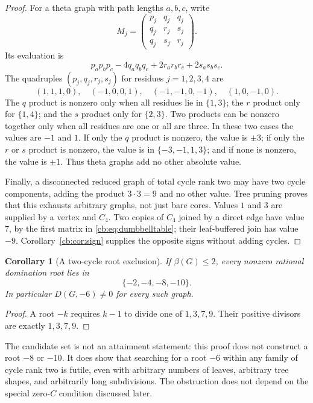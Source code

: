 \documentclass[11pt]{article}
\numberwithin{equation}{section}
\newtheorem{corollary}[theorem]{Corollary}
\theoremstyle{definition}
\begin{document}
\begin{proof}
For a theta graph with path lengths $a,b,c$, write
\[
 M_j=\begin{pmatrix}p_j&q_j&q_j\\q_j&r_j&s_j\\q_j&s_j&r_j\end{pmatrix}.
\]
Its evaluation is
\begin{equation}\label{cb:eq:theta}
 p_ap_bp_c-4q_aq_bq_c+2r_ar_br_c+2s_as_bs_c.
\end{equation}
The quadruples $(p_j,q_j,r_j,s_j)$ for residues $j=1,2,3,4$ are
\[
 (1,1,1,0),\quad(-1,0,0,1),\quad(-1,-1,0,-1),\quad(1,0,-1,0).
\]
The $q$ product is nonzero only when all residues lie in $\{1,3\}$;
the $r$ product only for $\{1,4\}$; and the $s$ product only for
$\{2,3\}$. Two products can be nonzero together only when all residues
are one or all are three. In these two cases the values are $-1$ and $1$.
If only the $q$ product is nonzero, the value is $\pm3$; if only the $r$
or $s$ product is nonzero, the value is in $\{-3,-1,1,3\}$; and if none
is nonzero, the value is $\pm1$. Thus theta graphs add no other absolute
value.

Finally, a disconnected reduced graph of total cycle rank two may have
two cycle components, adding the product $3\cdot3=9$ and no other value.
Tree pruning proves that this exhausts arbitrary graphs, not just bare
cores. Values $1$ and $3$ are supplied by a vertex and $C_4$. Two copies
of $C_4$ joined by a direct edge have value $7$, by the first matrix in
\eqref{cb:eq:dumbbelltable}; their leaf-buffered join has value $-9$.
Corollary~\ref{cb:cor:sign} supplies the opposite signs without adding cycles.
\end{proof}

\begin{corollary}[A two-cycle root exclusion]\label{cb:cor:no6}
If $\beta(G)\le2$, every nonzero rational domination root lies in
\[
 \{-2,-4,-8,-10\}.
\]
In particular $D(G,-6)\ne0$ for every such graph.
\end{corollary}
\begin{proof}
A root $-k$ requires $k-1$ to divide one of $1,3,7,9$. Their positive
divisors are exactly $1,3,7,9$.
\end{proof}

The candidate set is not an attainment statement: this proof does not
construct a root $-8$ or $-10$. It does show that searching for a root
$-6$ within any family of cycle rank two is futile, even with arbitrary
numbers of leaves, arbitrary tree shapes, and arbitrarily long subdivisions.
The obstruction does not depend on the special zero-$C$ condition discussed
later.
\end{document}

